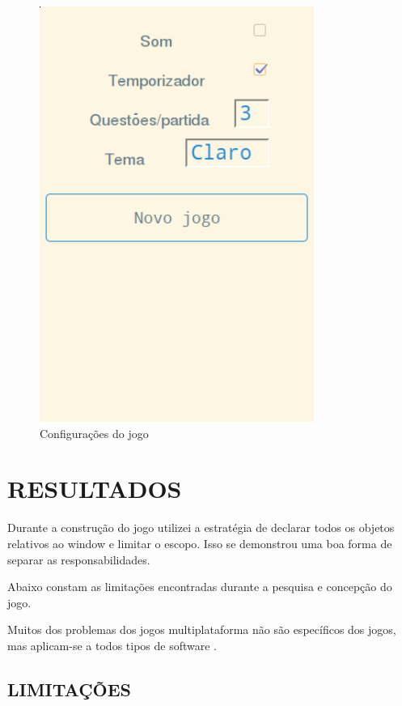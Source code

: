\documentclass[
12pt,
a4paper,
portuges,
draft
]{report}
\begin{document}
\begin{figure}
    \centering
    \includegraphics[width=0.8\textwidth,natwidth=610,natheight=642]{settings.png}
	\caption{Configurações do jogo}
\end{figure}

\chapter{RESULTADOS}
\thispagestyle{myheadings}

Durante a construção do jogo utilizei a estratégia de declarar todos
os objetos relativos ao window e limitar o escopo. Isso se demonstrou uma boa forma de separar as responsabilidades.

Abaixo constam as limitações encontradas durante a pesquisa e concepção do jogo.

Muitos dos problemas dos jogos multiplataforma não são específicos
dos jogos, mas aplicam-se a todos tipos de software  \parencite{currentStateCrossPlatform}.

\section{LIMITAÇÕES}
\end{document}

